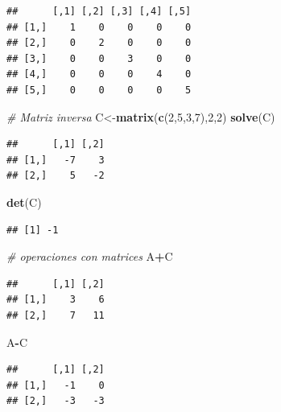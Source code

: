 \documentclass[
]{book}
\newenvironment{Shaded}{\begin{snugshade}}{\end{snugshade}}
\newcommand{\CommentTok}[1]{\textcolor[rgb]{0.56,0.35,0.01}{\textit{#1}}}
\newcommand{\DecValTok}[1]{\textcolor[rgb]{0.00,0.00,0.81}{#1}}
\newcommand{\KeywordTok}[1]{\textcolor[rgb]{0.13,0.29,0.53}{\textbf{#1}}}
\newcommand{\NormalTok}[1]{#1}
\newcommand{\OperatorTok}[1]{\textcolor[rgb]{0.81,0.36,0.00}{\textbf{#1}}}
\begin{document}
\begin{verbatim}
##      [,1] [,2] [,3] [,4] [,5]
## [1,]    1    0    0    0    0
## [2,]    0    2    0    0    0
## [3,]    0    0    3    0    0
## [4,]    0    0    0    4    0
## [5,]    0    0    0    0    5
\end{verbatim}

\begin{Shaded}
\begin{Highlighting}[]
\CommentTok{# Matriz inversa}
\NormalTok{C<-}\KeywordTok{matrix}\NormalTok{(}\KeywordTok{c}\NormalTok{(}\DecValTok{2}\NormalTok{,}\DecValTok{5}\NormalTok{,}\DecValTok{3}\NormalTok{,}\DecValTok{7}\NormalTok{),}\DecValTok{2}\NormalTok{,}\DecValTok{2}\NormalTok{)}
\KeywordTok{solve}\NormalTok{(C)}
\end{Highlighting}
\end{Shaded}

\begin{verbatim}
##      [,1] [,2]
## [1,]   -7    3
## [2,]    5   -2
\end{verbatim}

\begin{Shaded}
\begin{Highlighting}[]
\KeywordTok{det}\NormalTok{(C)}
\end{Highlighting}
\end{Shaded}

\begin{verbatim}
## [1] -1
\end{verbatim}

\begin{Shaded}
\begin{Highlighting}[]
\CommentTok{# operaciones con matrices}
\NormalTok{A}\OperatorTok{+}\NormalTok{C}
\end{Highlighting}
\end{Shaded}

\begin{verbatim}
##      [,1] [,2]
## [1,]    3    6
## [2,]    7   11
\end{verbatim}

\begin{Shaded}
\begin{Highlighting}[]
\NormalTok{A}\OperatorTok{-}\NormalTok{C}
\end{Highlighting}
\end{Shaded}

\begin{verbatim}
##      [,1] [,2]
## [1,]   -1    0
## [2,]   -3   -3
\end{verbatim}
\end{document}
